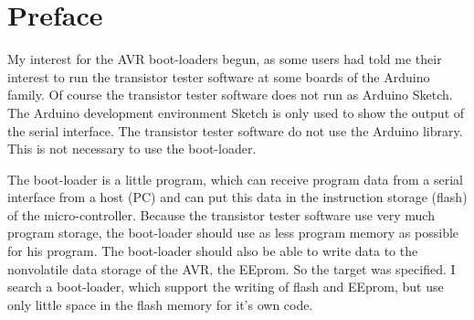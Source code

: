 \section*{Preface}

My interest for the AVR boot-loaders begun, as some users had told
me their interest to run the transistor tester software at
some boards of the Arduino family.
Of course the transistor tester software does not run as Arduino Sketch.
The Arduino development environment Sketch is only used to show
the output of the serial interface.
The transistor tester software do not use the Arduino library.
This is not necessary to use the boot-loader.


The boot-loader is a little program, which can receive program data
from a serial interface from a host (PC) and can put this data
in the instruction storage (flash) of the micro-controller.
Because the transistor tester software use very much program storage,
the boot-loader should use as less program memory as possible for
his program.
The boot-loader should also be able to write data to the
nonvolatile data storage of the AVR, the EEprom.
So the target was specified. I search a boot-loader,
which support the writing of flash and EEprom,
but use only little space in the flash memory for it's own code.

